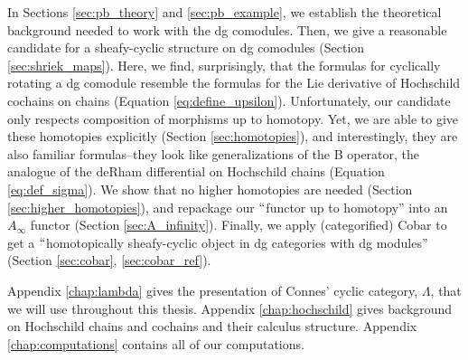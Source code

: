 In Sections \ref{sec:pb_theory} and \ref{sec:pb_example}, we establish the theoretical background needed to work with the dg comodules. Then, we give a reasonable candidate for a sheafy-cyclic structure on dg comodules (Section \ref{sec:shriek_maps}). Here, we find, surprisingly, that the formulas for cyclically rotating a dg comodule resemble the formulas for the Lie derivative of Hochschild cochains on chains (Equation \ref{eq:define_upsilon}). Unfortunately, our candidate only respects composition of morphisms up to homotopy. Yet, we are able to give these homotopies explicitly (Section \ref{sec:homotopies}), and interestingly, they are also familiar formulas--they look like generalizations of the B operator, the analogue of the deRham differential on Hochschild chains (Equation \ref{eq:def_sigma}). We show that no higher homotopies are needed (Section \ref{sec:higher_homotopies}), and repackage our $``$functor up to homotopy'' into an $A_\infty$ functor (Section \ref{sec:A_infinity}). Finally, we apply (categorified) Cobar to get a $``$homotopically sheafy-cyclic object in dg categories with dg modules'' (Section \ref{sec:cobar}, \ref{sec:cobar_ref}).

Appendix \ref{chap:lambda} gives the presentation of Connes' cyclic category, $\Lambda$, that we will use throughout this thesis. Appendix \ref{chap:hochschild} gives background on Hochschild chains and cochains and their calculus structure. Appendix \ref{chap:computations} contains all of our computations.

%